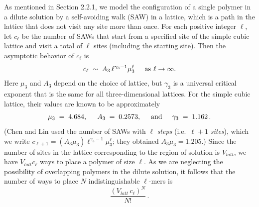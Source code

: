 \documentclass[journal=mamobx,manuscript=article]{achemso}
\begin{document}
As mentioned in Section 2.2.1, we model the configuration of a single  polymer in a dilute solution by a self-avoiding walk (SAW) in a lattice, which is a path in the lattice that does not visit any site more than once.
For each positive integer $\ell$, let $c_{\ell}$ be
the number of SAWs that start from a specified site of the simple cubic lattice and visit a total of $\ell$ sites (including the starting site).
Then the asymptotic behavior of $c_{\ell}$ 
is\cite{Madras2013} 
\begin{equation}
    \label{eq.sawscale}
       c_{\ell}  \;\sim  \;  A_3 \, {\ell}^{\gamma_3-1}  \mu_3^{\ell}    \hspace{5mm}\hbox{as $\ell\rightarrow\infty$}.
\end{equation}
Here $\mu_3$ and $A_3$ depend on the choice of lattice, but $\gamma_3$ is a universal critical exponent
that is the same for all three-dimensional lattices.  
For the simple cubic lattice, 
their values are known to be approximately \cite{Chen2002,Madras2013}
\begin{equation}
   \label{eq.gammas}   \mu_3 \;=\;  4.684, \hspace{5mm}
        A_3 \;=\;  0.2573,    \hspace{5mm}\hbox{and}\hspace{5mm}
   \gamma_3 \;=\;  1.162 \,.  %
\end{equation}
(Chen and Lin\cite{Chen2002} used the 
number of SAWs with $\ell$ \textit{steps} (i.e.\ $\ell+1$ \textit{sites}), which we write  $c_{\ell+1}=(A_3\mu_3)\ell^{\gamma_3-1}\mu_3^{\ell}$; %
they obtained $A_3\mu_3=1.205$.)
Since the number of sites in the lattice corresponding to the region of solution is $V_{latt}$, 
we have $V_{latt}c_{\ell}$ ways to place a polymer of size ${\ell}$.  As we are neglecting the
possibility of overlapping polymers in the dilute solution, it follows that the number of ways to 
place $N$ indistinguishable $\ell$-mers is 
\begin{equation}
  \label{eq.Npoly}
   \frac{(V_{latt}\,c_{\ell})^N}{N!}  \,.   
\end{equation}
\end{document}
